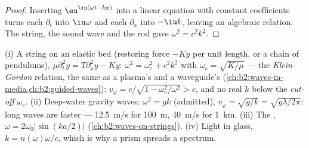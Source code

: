 \begin{proof}
Inserting $\eu^{\iu(\omega t - kx)}$ into a linear equation with constant
coefficients turns each $\partial_t$ into $\iu\omega$ and each $\partial_x$ into
$-\iu k$, leaving an algebraic relation. The string, the sound wave and
the rod gave $\omega^2 = c^2k^2$.
\end{proof}

\begin{example}\label{ex:b2:dispersion-wave-packets:examples}
(i) A string on an elastic bed (restoring force $-Ky$ per unit length,
or a chain of pendulums), $\mu\partial_t^2y = T\partial_x^2y - Ky$: $\omega^2 = \omega_c^2
+ c^2k^2$ with $\omega_c = \sqrt{K/\mu}$ --- the \emph{Klein--Gordon}
relation, the same as a plasma's and a waveguide's
(\cref{ch:b2:waves-in-media,ch:b2:guided-waves}): $v_\varphi = c/\sqrt{1 -
\omega_c^2/\omega^2} > c$, and no real $k$ below the \emph{cut-off} $\omega_c$.
(ii) Deep-water gravity waves: $\omega^2 = gk$ (admitted), $v_\varphi =
\sqrt{g/k} = \sqrt{g\lambda/2\pi}$: long waves are faster --- \qty{12.5}{m/s} for
\qty{100}{m}, \qty{40}{m/s} for \qty{1}{km}. (iii) The , $\omega =
2\omega_0|\sin(ka/2)|$ (\cref{ch:b2:waves-on-strings}). (iv) Light in glass,
$k = n(\omega)\omega/c$, which is why a prism spreads a spectrum.
\end{example}

